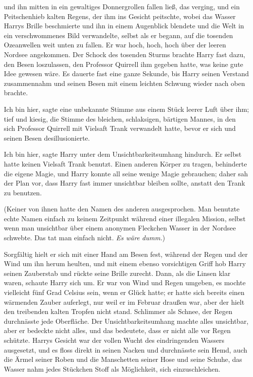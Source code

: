und ihn mitten in ein gewaltiges Donnergrollen fallen ließ, das verging, und ein
Peitschenhieb kalten Regens, der ihm ins Gesicht peitschte, wobei das Wasser
Harrys Brille beschmierte und ihn in einem Augenblick blendete und die Welt in
ein verschwommenes Bild verwandelte, selbst als er begann, auf die tosenden
Ozeanwellen weit unten zu fallen. Er war hoch, hoch, hoch über der leeren
Nordsee angekommen. Der Schock des tosenden Sturms brachte Harry fast dazu, den
Besen loszulassen, den Professor Quirrell ihm gegeben hatte, was keine gute Idee
gewesen wäre. Es dauerte fast eine ganze Sekunde, bis Harry seinen Verstand
zusammennahm und seinen Besen mit einem leichten Schwung wieder nach oben
brachte.

\glqq{}Ich bin hier\grqq{}, sagte eine unbekannte Stimme aus einem Stück leerer
Luft über ihm; tief und kiesig, die Stimme des bleichen, schlaksigen, bärtigen
Mannes, in den sich Professor Quirrell mit Vielsaft Trank verwandelt hatte,
bevor er sich und seinen Besen desillusionierte.

\glqq{}Ich bin hier\grqq{}, sagte Harry unter dem Unsichtbarkeitsumhang hindurch.
Er selbst hatte keinen Vielsaft Trank benutzt. Einen anderen Körper zu tragen,
behinderte die eigene Magie, und Harry konnte all seine wenige Magie gebrauchen;
daher sah der Plan vor, dass Harry fast immer unsichtbar bleiben sollte, anstatt
den Trank zu benutzen.

(Keiner von ihnen hatte den Namen des anderen ausgesprochen. Man benutzte echte
Namen einfach zu keinem Zeitpunkt während einer illegalen Mission, selbst wenn
man unsichtbar über einem anonymen Fleckchen Wasser in der Nordsee schwebte. Das
tat man einfach nicht. \emph{Es wäre dumm.})

Sorgfältig hielt er sich mit einer Hand am Besen fest, während der Regen und der
Wind um ihn herum heulten, und mit einem ebenso vorsichtigen Griff hob Harry
seinen Zauberstab und rückte seine Brille zurecht. Dann, als die Linsen klar
waren, schaute Harry sich um. Er war von Wind und Regen umgeben, es mochte
vielleicht fünf Grad Celsius sein, wenn er Glück hatte; er hatte sich bereits
einen wärmenden Zauber auferlegt, nur weil er im Februar draußen war, aber der
hielt den treibenden kalten Tropfen nicht stand. Schlimmer als Schnee, der Regen
durchnässte jede Oberfläche. Der Unsichtbarkeitsumhang machte alles unsichtbar,
aber er bedeckte nicht alles, und das bedeutete, dass er nicht alle vor Regen
schützte. Harrys Gesicht war der vollen Wucht des eindringenden Wassers
ausgesetzt, und es floss direkt in seinen Nacken und durchnässte sein Hemd, auch
die Ärmel seiner Roben und die Manschetten seiner Hose und seine Schuhe, das
Wasser nahm jedes Stückchen Stoff als Möglichkeit, sich einzuschleichen.

